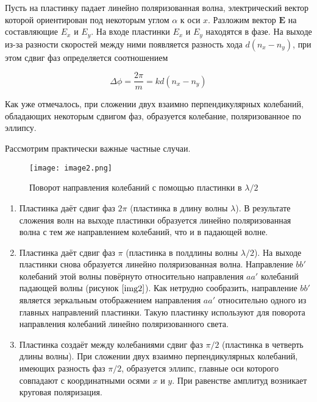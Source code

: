 \documentclass[a4paper,12pt]{article} %
\begin{document}
Пусть на пластинку падает линейно поляризованная волна, электрический вектор которой ориентирован под некоторым углом $\alpha$ к оси
$x$. Разложим вектор $\mathbf{E}$ на составляющие $E_x$ и $E_y$. На входе пластинки $E_x$ и $E_y$ находятся в фазе. На выходе из-за разности скоростей между ними появляется разность хода $d(n_x-n_y)$, при этом сдвиг фаз определяется соотношением

\[ \Delta \phi =  \dfrac{2\pi}{m} = k d(n_x - n_y) \]

Как уже отмечалось, при сложении двух взаимно перпендикулярных колебаний, обладающих некоторым сдвигом фаз, образуется колебание, поляризованное по эллипсу.

Рассмотрим практически важные частные случаи.

\begin{wrapfigure}{l}{0.35\linewidth}
    \texttt{[image: image2.png]}
    \caption{Поворот направления колебаний с помощью пластинки в $\lambda/2$}
    \label{img2}
\end{wrapfigure}

 \begin{enumerate}
 		
 	\item Пластинка даёт сдвиг фаз $ 2\pi $ (пластинка в длину волны $ \lambda $). В результате сложения волн на выходе пластинки образуется линейно поляризованная волна с тем же направлением колебаний, что и в падающей волне.

	\item Пластинка даёт сдвиг фаз $\pi$ (пластинка в полдлины волны $\lambda/2$). На выходе пластинки снова образуется линейно поляризованная волна. Направление $bb'$ колебаний этой волны повёрнуто относительно направления $aa'$ колебаний падающей волны (рисунок $\ref{img2}$). Как нетрудно сообразить, направление $bb'$ является зеркальным отображением направления $aa'$ относительно одного из главных направлений пластинки. Такую пластинку используют для поворота направления колебаний линейно поляризованного света.
	
	\item Пластинка создаёт между колебаниями сдвиг фаз $\pi/2$ (пластинка в четверть длины волны). При сложении двух взаимно перпендикулярных колебаний, имеющих разность фаз $\pi/2$, образуется эллипс, главные оси которого совпадают с координатными осями $x$ и $y$. При равенстве амплитуд возникает круговая поляризация.
 	
 \end{enumerate}
\end{document}
